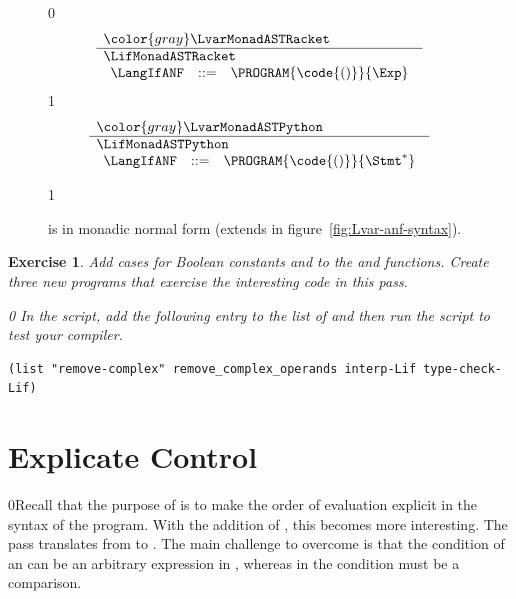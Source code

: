 \documentclass[7x10]{TimesAPriori_MIT}%
\newcommand{\gray}[1]{{\color{gray} #1}}
\def\racketEd{0}
\def\pythonEd{1}
\def\edition{1}
\newcommand{\racket}[1]{{\if\edition\racketEd{#1}\fi}}
\newcommand{\pythonColor}[0]{}
\newcommand{\python}[1]{{\if\edition\pythonEd\pythonColor #1\fi}}
\newtheorem{exercise}[theorem]{Exercise}
\numberwithin{theorem}{chapter}
\numberwithin{definition}{chapter}
\numberwithin{equation}{chapter}
\begin{document}
\begin{figure}[tp]
\centering
\begin{tcolorbox}[colback=white]
{\if\edition\racketEd    
\[
\begin{array}{l}
  \gray{\LvarMonadASTRacket} \\ \hline
  \LifMonadASTRacket \\
\begin{array}{rcl}
\LangIfANF  &::=& \PROGRAM{\code{()}}{\Exp}
\end{array}
\end{array}
\]
\fi}
{\if\edition\pythonEd\pythonColor
\[
\begin{array}{l}
  \gray{\LvarMonadASTPython} \\ \hline
  \LifMonadASTPython \\
   \begin{array}{rcl}
     \LangIfANF  &::=& \PROGRAM{\code{()}}{\Stmt^{*}}
   \end{array}
\end{array}
\]
\fi}
\end{tcolorbox}
\python{}
\caption{\LangIfANF{} is \LangIf{} in monadic normal form
  (extends \LangVarANF in figure~\ref{fig:Lvar-anf-syntax}).}
\label{fig:Lif-anf-syntax}
\end{figure}


\begin{exercise}\normalfont\normalsize
%
Add cases for Boolean constants and  to the 
and  functions.
%
Create three new \LangIf{} programs that exercise the interesting
code in this pass.
%
{\if\edition\racketEd    
In the  script, add the following entry to the
list of  and then run the script to test your compiler.
\begin{lstlisting}
(list "remove-complex" remove_complex_operands interp-Lif type-check-Lif)
\end{lstlisting}
\fi}
\end{exercise}


\section{Explicate Control}
\label{sec:explicate-control-Lif}

\racket{Recall that the purpose of  is to
  make the order of evaluation explicit in the syntax of the program.
  With the addition of \key{if}, this becomes more interesting.}
%
The  pass translates from \LangIf{} to \LangCIf{}.
%
The main challenge to overcome is that the condition of an 
can be an arbitrary expression in \LangIf{}, whereas in \LangCIf{} the
condition must be a comparison.
\end{document}
